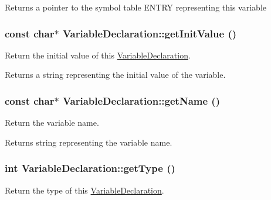 \begin{DoxyReturn}{Returns}
a pointer to the symbol table ENTRY representing this variable 
\end{DoxyReturn}
\hypertarget{classVariableDeclaration_ad4e01c324003e1730afcfe3a231ee2a0}{
\subsubsection[{getInitValue}]{\setlength{\rightskip}{0pt plus 5cm}const char$\ast$ VariableDeclaration::getInitValue ()}}
\label{classVariableDeclaration_ad4e01c324003e1730afcfe3a231ee2a0}
Return the initial value of this \hyperlink{classVariableDeclaration}{VariableDeclaration}.

\begin{DoxyReturn}{Returns}
a string representing the initial value of the variable. 
\end{DoxyReturn}
\hypertarget{classVariableDeclaration_a0651102c92331f832679816bccd08ddd}{
\subsubsection[{getName}]{\setlength{\rightskip}{0pt plus 5cm}const char$\ast$ VariableDeclaration::getName ()}}
\label{classVariableDeclaration_a0651102c92331f832679816bccd08ddd}
Return the variable name.

\begin{DoxyReturn}{Returns}
string representing the variable name. 
\end{DoxyReturn}
\hypertarget{classVariableDeclaration_a1384f2df0a1fcc9d2f55a20d4db0d34b}{
\subsubsection[{getType}]{\setlength{\rightskip}{0pt plus 5cm}int VariableDeclaration::getType ()}}
\label{classVariableDeclaration_a1384f2df0a1fcc9d2f55a20d4db0d34b}
Return the type of this \hyperlink{classVariableDeclaration}{VariableDeclaration}.

